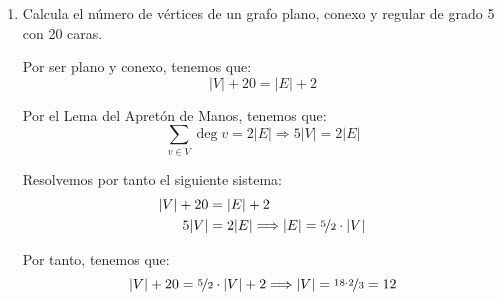 \begin{ejercicio}
\begin{enumerate}
        \item Calcula el número de vértices de un grafo plano, conexo y regular de grado 5 con 20 caras.
        
        Por ser plano y conexo, tenemos que:
        \begin{equation*}
            |V|+20=|E|+2
        \end{equation*}

        Por el Lema del Apretón de Manos, tenemos que:
        \begin{equation*}
            \sum_{v\in V} \deg v = 2|E|\Longrightarrow
            5|V|=2|E|
        \end{equation*}

        Resolvemos por tanto el siguiente sistema:
        \begin{align*}
            |V|+20&=|E|+2\\
            5|V|&=2|E|\Longrightarrow
            |E|=\nicefrac{5}{2}\cdot |V|
        \end{align*}

        Por tanto, tenemos que:
        \begin{equation*}
            |V|+20=\nicefrac{5}{2}\cdot |V|+2
            \Longrightarrow
            |V|=\nicefrac{18\cdot 2}{3}=12
        \end{equation*}
    \end{enumerate}
\end{ejercicio}

